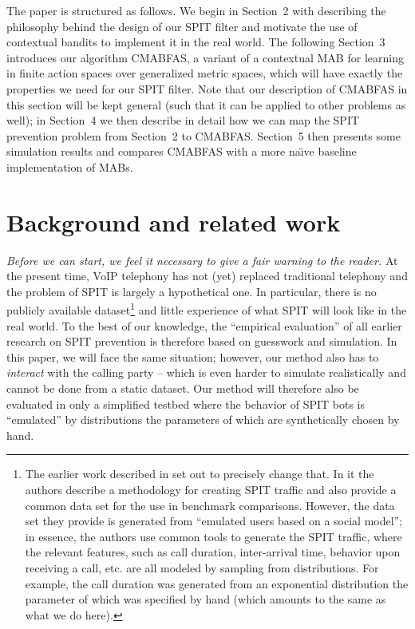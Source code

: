 \documentclass{llncs}
\begin{document}
The paper is structured as follows. We begin in Section~2 with describing the philosophy behind the design
of our SPIT filter and motivate the use of contextual bandits to implement it in the real world. The
following Section~3 introduces our algorithm CMABFAS, a variant of a contextual MAB for learning in finite
action spaces over generalized metric spaces, which will have exactly the properties we need for our 
SPIT filter. Note that our description of CMABFAS in this section will be kept general (such that it can 
be applied to other problems as well); in Section~4 we then describe in detail how we can map the 
SPIT prevention problem from Section~2 to CMABFAS. Section~5 then presents some simulation results and 
compares CMABFAS with a more na\"{\i}ve baseline implementation of MABs.


\section{Background and related work}
{\em Before we can start, we feel it necessary to give a fair warning to the reader.} At the present time, 
VoIP telephony has not (yet) replaced traditional telephony and the problem of SPIT is largely a
hypothetical one. In particular, there is no publicly available dataset\footnote{The earlier work 
described in \cite{bab} set out to precisely change that. In it the authors describe a methodology for creating SPIT traffic 
and also provide a common data set for the use in benchmark comparisons. However, the data set they provide is generated 
from ``emulated users based on a social model''; in essence, the authors use common tools to generate the SPIT traffic,
where the relevant features, such as call duration, inter-arrival time, behavior upon receiving a call, etc. are all modeled by 
sampling from distributions. For example, the call duration was generated from an exponential distribution the parameter of which
was specified by hand (which amounts to the same as what we do here). 
} and little experience of what SPIT will look like in the real world. To the best of our knowledge, 
the ``empirical evaluation'' of all earlier research on SPIT prevention is therefore based on guesswork and simulation. 
In this paper, we will face the same situation; however, our method also has to {\em interact}
with the calling party -- which is even harder to simulate realistically and cannot be done from a static dataset. 
Our method will therefore also be evaluated in only a simplified testbed where the behavior of SPIT bots is ``emulated'' 
by distributions the parameters of which are synthetically chosen by hand. 
 
\end{document}
